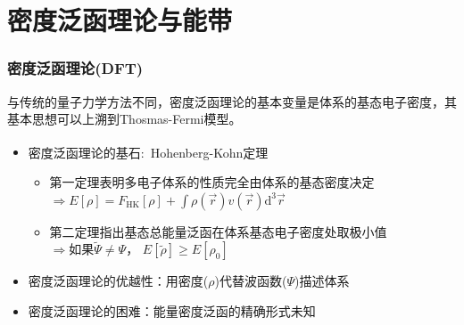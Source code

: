 \documentclass[cjk,slidestop,compress,mathserif,blue]{beamer}
\newcommand{\upcite}[1]{\hspace{0ex}\textsuperscript{\cite{#1}}} %
\begin{document}

\section{密度泛函理论与能带}       %
\frame                               %
{
\frametitle{密度泛函理论(\textrm{DFT})} %
与传统的量子力学方法不同，密度泛函理论的基本变量是体系的基态电子密度，其基本思想可以上溯到\textrm{Thosmas-Fermi}模型。%
\begin{itemize}%
	\item 密度泛函理论的基石:~\textrm{Hohenberg-Kohn}定理\upcite{PR136-B864_1964}
\vskip 5pt
\begin{itemize}%
   \setlength{\itemsep}{5pt}
 \item \textrm{\small{第一定理表明多电子体系的性质完全由体系的基态密度决定}}
	 $\Rightarrow E[\rho]=F_{\mathrm{HK}}[\rho]+\displaystyle\int\rho(\vec{r})v(\vec{r})\textrm{d}^{3}\vec{r}$ \\
	 {\fontsize{7.5pt}{6.2pt}}%
   \item \textrm{\small{第二定理指出基态总能量泛函在体系基态电子密度处取极小值}}
   $\Rightarrow\mbox{如果}\tilde\Psi\neq\Psi$，
     $E[\tilde\rho]\geqslant E[\rho_0]$
   \end{itemize}
\vskip 8pt
 \item 密度泛函理论的优越性：用密度($\rho$)代替波函数($\Psi$)描述体系
\vskip 5pt
 \item 密度泛函理论的困难：能量密度泛函的精确形式未知
   \end{itemize}
}
\end{document}
